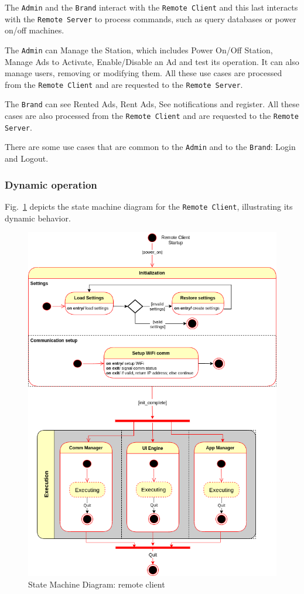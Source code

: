 The \texttt{Admin} and the \texttt{Brand} interact with the \texttt{Remote Client} and this last interacts with the \texttt{Remote Server} to process commands, such as query databases or power on/off machines.

The \texttt{Admin} can Manage the Station, which includes Power On/Off Station, Manage Ads to Activate, Enable/Disable an Ad and test its operation.
It can also manage users, removing or modifying them. All these use cases are processed from the \texttt{Remote Client} and are requested to the \texttt{Remote Server}.

The \texttt{Brand} can see Rented Ads, Rent Ads, See notifications and register. All these cases are also processed from the \texttt{Remote Client} and are requested to the \texttt{Remote Server}.

There are some use cases that are common to the  \texttt{Admin} and to the \texttt{Brand}: Login and Logout.
%
\subsubsection{Dynamic operation}
\label{sec:dyn-oper-1}

Fig.~\ref{fig:state-mach-rc} depicts the state machine diagram for the
\texttt{Remote Client}, illustrating its dynamic behavior.
%
\begin{figure}[htb!]
\centering
    \includegraphics[width=0.9\columnwidth]{./img/state-mach-rc.png}
  \caption{State Machine Diagram: remote client}%
\label{fig:state-mach-rc}
\end{figure}
%

